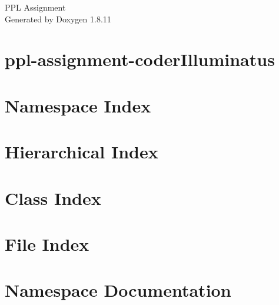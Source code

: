 \documentclass[twoside]{book}
\newcommand{\+}{\discretionary{\mbox{\scriptsize$\hookleftarrow$}}{}{}}
\newcommand{\clearemptydoublepage}{%
  \newpage{\pagestyle{empty}\cleardoublepage}%
}
\begin{document}
\hypersetup{pageanchor=false,
             bookmarksnumbered=true,
             pdfencoding=unicode
            }
\begin{titlepage}
\vspace*{7cm}
\begin{center}%
{\Large P\+PL Assignment }\\
\vspace*{1cm}
{\large Generated by Doxygen 1.8.11}\\
\end{center}
\end{titlepage}
\clearemptydoublepage
\tableofcontents
\clearemptydoublepage
{}
\hypersetup{pageanchor=true}

\chapter{ppl-\/assignment-\/coder\+Illuminatus}
\label{md__media_illuminatus_Study_Python_Programming_Projects_PPL_Assignment_README}
\hypertarget{md__media_illuminatus_Study_Python_Programming_Projects_PPL_Assignment_README}{}

\chapter{Namespace Index}

\chapter{Hierarchical Index}

\chapter{Class Index}

\chapter{File Index}

\chapter{Namespace Documentation}























\end{document}
